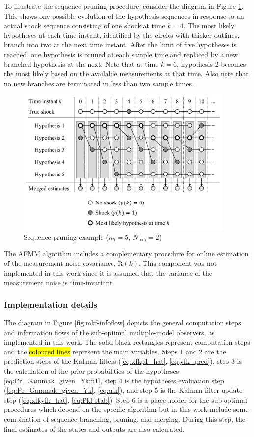 {{To illustrate the sequence pruning procedure, consider the diagram in Figure \ref{fig:mm-obs-seq-SP}. This shows one possible evolution of the hypothesis sequences in response to an actual shock sequence consisting of one shock at time $k=4$.  The most likely hypotheses at each time instant, identified by the circles with thicker outlines, branch into two at the next time instant. After the limit of five hypotheses is reached, one hypothesis is pruned at each sample time and replaced by a new branched hypothesis at the next. Note that at time $k=6$, hypothesis 2 becomes the most likely based on the available measurements at that time. Also note that no new branches are terminated in less than two sample times.
\begin{figure}[ht]
	\centering
	\includegraphics[width=10.7cm]{images/mm_obs_seq_SP.pdf}
	\caption{Sequence pruning example ($n_h=5$, $N_\text{min}=2$)}
	\label{fig:mm-obs-seq-SP}
\end{figure}

The \gls{AFMM} algorithm includes a complementary procedure for online estimation of the measurement noise covariance, $\mathrm{R}(k)$. This component was not implemented in this work since it is assumed that the variance of the measurement noise is time-invariant.

\subsubsection{Implementation details} \label{sec:implementation}

The diagram in Figure \ref{fig:mkf-infoflow} depicts the general computation steps and information flows of the sub-optimal multiple-model observers, as implemented in this work. The solid black rectangles represent computation steps and the \hl{coloured lines} represent the main variables. Steps 1 and 2 are the prediction steps of the Kalman filters (\ref{eq:xfkp1_hat}, \ref{eq:yfk_pred}), step 3 is the calculation of the prior probabilities of the hypotheses \eqref{eq:Pr_Gammak_given_Ykm1}, step 4 is the hypotheses evaluation step (\ref{eq:Pr_Gammak_given_Yk}, \ref{eq:qfk}), and step 5 is the Kalman filter update step (\ref{eq:xfkyfk_hat}, \ref{eq:Pkf-stab}). Step 6 is a place-holder for the sub-optimal procedures which depend on the specific algorithm but in this work include some combination of sequence branching, pruning, and merging. During this step, the final estimates of the states and outputs are also calculated.

}}
